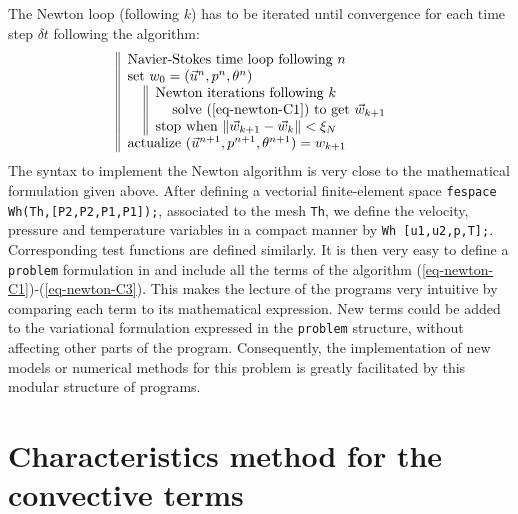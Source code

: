 The Newton loop (following $k$) has to be iterated until convergence for each time step $\delta t$ following the algorithm:
\begin{equation} \label{eq-Newton-algo}
\begin{tabular}{||ll}
\multicolumn{2}{||l}{Navier-Stokes time loop following $n$}\\
\multicolumn{2}{||l}{set  $w_0=(\vec{u}^{n}, p^{n}, \theta^{n})$}\\
& \begin{tabular}[t]{||ll}
\multicolumn{2}{||l}{Newton iterations  following $k$}\\
&solve (\ref{eq-newton-C1}) to get $ \vec w_{k+1} $\\
\multicolumn{2}{||l}{stop when  $\| \vec w_{k+1} - \vec w_k \| < \xi_N$}
\end{tabular}\\
\multicolumn{2}{||l}{actualize $(\vec{u}^{n+1}, p^{n+1}, \theta^{n+1}) = w_{k+1}$}
\end{tabular}
\end{equation}
The \ff syntax to implement the Newton algorithm is very close to the mathematical formulation given above. 
	After defining a vectorial finite-element space \texttt{fespace Wh(Th,[P2,P2,P1,P1]);}, associated to the mesh \texttt{Th}, we define the velocity, pressure and temperature variables in a compact manner by \texttt{Wh [u1,u2,p,T];}. Corresponding test functions are defined similarly. It is then very easy to define a \texttt{problem} formulation in \ff and include all the terms of the algorithm  (\ref{eq-newton-C1})-(\ref{eq-newton-C3}). This makes the lecture of the programs very intuitive by comparing each term to its mathematical expression. New terms could be added to the variational formulation expressed in the \texttt{problem} structure, without affecting other parts of the program. Consequently, the implementation of new models  or numerical methods for this problem is greatly facilitated by this modular structure of programs.

\section{Characteristics method for the convective terms} \label{sec-charac-FreeFem}

